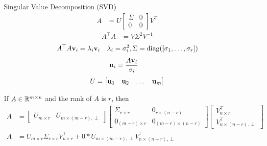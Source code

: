 \documentclass[times,t]{beamer}
\DeclareMathOperator{\diag}{diag}
\begin{document}
\begin{frame}{Singular Value  Decomposition (SVD)}
  \begin{align*}
    A  &=   U  \begin{bmatrix}\Sigma   &  0  \\   0  &  0 \end{bmatrix} V^\top
  \end{align*}
  \begin{align*}
    A^\top A &= V \Sigma^2  V^{-1}
  \end{align*}
  \begin{align*}
    A^\top A \bfv_i  &= \lambda_i \bfv_i & \lambda_i = \sigma_i^2, \Sigma = \diag([\sigma_1, \dots, \sigma_r])\\
  \end{align*}
  \begin{align*}
    \mathbf{u}_i   &=  \frac{A\mathbf{v}_i}{\sigma_i}
    \end{align*}
    \begin{align*}
      U = \begin{bmatrix}
        \mathbf{u}_1 & \mathbf{u}_2 & \dots & \mathbf{u}_m
      \end{bmatrix}
    \end{align*}
\end{frame}

\begin{frame}
  If $A \in \mathbb{R}^{m \times n}$ and the rank of $A$ is $r$, then
  \begin{align*}
    A  &=   \begin{bmatrix}U_{m\times r} & U_{m \times (m-r),\perp}\end{bmatrix}  \begin{bmatrix}\Sigma_{r \times r}   &  0_{r \times (n-r)}  \\   0_{(m-r)\times r}  &  0_{(m-r)\times (n-r)} \end{bmatrix} \begin{bmatrix} V_{n \times r}^\top  \\ V_{n \times (n-r),\perp}^\top \end{bmatrix}
    \\
    A &= U_{m \times r} \Sigma_{r \times r} V_{n \times r}^\top + 0 * U_{m \times (m-r),\perp} V_{n \times (n-r),\perp}^\top
  \end{align*}
\end{frame}
\end{document}
